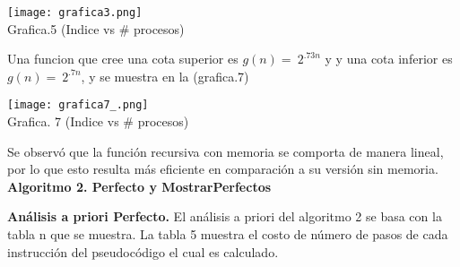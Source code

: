 \documentclass[12pt,twoside]{article}
\begin{document}
\begin{center}
  \begin{minipage}{\linewidth}
    \centering
    \texttt{[image: grafica3.png]}
    \\
    Grafica.5 (Indice vs \# procesos)
\end{minipage}
\end{center}
\medskip

\newpage

Una funcion que cree una cota superior es $g(n) = \ 2^{.73n}$ y y una cota inferior es $g(n) = \ 2^{.7n}$, y se muestra en la (grafica.7)

\begin{center}
  \begin{minipage}{\linewidth}
    \centering
    \texttt{[image: grafica7\_.png]}
    \\
    Grafica. 7 (Indice vs \# procesos)
\end{minipage}
\end{center}
\medskip

Se observó que la función recursiva con memoria se comporta de manera lineal, por lo que esto resulta más eficiente en comparación a su versión sin memoria.
\newpage
\textbf{Algoritmo 2. Perfecto y MostrarPerfectos}
\medskip

\textbf{Análisis a priori Perfecto.} 
El análisis a priori del algoritmo 2 se basa con la tabla n que se muestra. La tabla 5 muestra el costo de número de pasos de cada instrucción del pseudocódigo el cual es calculado. 
\medskip
\end{document}
